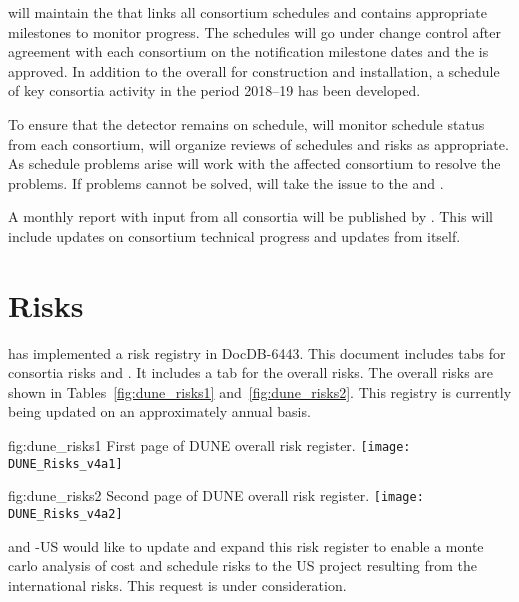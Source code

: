  will maintain the  that links all consortium schedules
and contains appropriate milestones to monitor progress.
The schedules will go under change control after agreement with each
consortium on the notification milestone dates and the  is
approved.
In addition to the overall  for construction and
installation, a schedule of key consortia activity in the period
2018--19  has been developed.

To ensure that the  detector remains on schedule,
 will monitor schedule status from each consortium, will organize
reviews of schedules and risks as appropriate.  As schedule problems
arise  will work with the affected consortium to resolve the
problems. If problems cannot be solved,  will take the issue to the
 and .

A monthly report with input from all consortia will be published by
. This will include updates on consortium technical progress and
updates from  itself.

\section{Risks}
\label{sec:fdsp-coord-risks}

 has implemented a risk registry in
DocDB-6443. This document includes tabs for consortia risks
and . It includes a tab for the overall
 risks. The overall  risks are shown in
Tables~\ref{fig:dune_risks1} and~\ref{fig:dune_risks2}. This registry
is currently being updated on an approximately annual basis.
\begin{dunefigure}{fig:dune_risks1}
  {First page of DUNE overall risk register.}
  \texttt{[image: DUNE\_Risks\_v4a1]}
\end{dunefigure}
\begin{dunefigure}{fig:dune_risks2}
  {Second page of DUNE overall risk register.}
  \texttt{[image: DUNE\_Risks\_v4a2]}
\end{dunefigure}
 and -US would like  to update and
expand this risk register to enable a monte carlo analysis of cost and
schedule risks to the US project resulting from the international
 risks. This request is under consideration.

